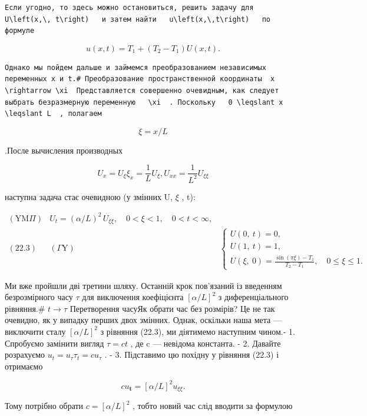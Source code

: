 \documentclass[
  ukrainian,
]{article}
\begin{document}
\begin{verbatim}
Если угодно, то здесь можно остановиться, решить задачу для   U\left(x,\, t\right)   и затем найти   u\left(x,\,t\right)   по формуле
\end{verbatim}

\[
u(x, t) = T_1 + (T_2 - T_1) U(x, t).
\]

\begin{verbatim}
Однако мы пойдем дальше и займемся преобразованием независимых переменных x и t.# Преобразование пространственной координаты  x \rightarrow \xi  Представляется совершенно очевидным, как следует выбрать безразмерную переменную   \xi  . Поскольку   0 \leqslant x \leqslant L  , полагаем
\end{verbatim}

\[
\xi = x/L
\]

.После вычисления производных

\[
U_x = U_{\xi} \xi_x = \frac{1}{L} U_{\xi},
U_{xx} = \frac{1}{L^2} U_{\xi\xi}
\]

наступна задача стає очевидною (у змінних U, \(\xi\) , t):

\[
\begin{array}{ll} (\text{YM}\Pi) & U_t = (\alpha/L)^2 \, U_{\xi\xi}, \quad 0 < \xi < 1, \quad 0 < t < \infty, \\ (22.3) & (\Gamma \text{Y}) & \begin{cases} U(0,\ t) = 0, \\ U(1,\ t) = 1, \\ U(\xi,\ 0) = \frac{\sin\left(\pi\xi\right) - T_1}{T_2 - T_1}, \quad 0 \leqslant \xi \leqslant 1. \end{cases} \end{array}
\]

Ми вже пройшли дві третини шляху. Останній крок пов'язаний із введенням
безрозмірного часу \(\tau\) для виключення коефіцієнта \([\alpha/L]^2\)
з диференціального рівняння.\# \(t \rightarrow \tau\) Перетворення
часуЯк обрати час без розмірів? Це не так очевидно, як у випадку перших
двох змінних. Однак, оскільки наша мета --- виключити сталу
\([\alpha/L]^2\) з рівняння (22.3), ми діятимемо наступним чином.- 1.
Спробуємо замінити вигляд \(\tau = ct\) , де c --- невідома константа. -
2. Давайте розрахуємо \(u_t = u_{\tau} \tau_t = c u_{\tau}\) . - 3.
Підставимо цю похідну у рівняння (22.3) і отримаємо

\[
cu_{\mathbf{t}} = [\alpha/L]^2 u_{\xi\xi}.
\]

Тому потрібно обрати \(c = [\alpha/L]^2\) , тобто новий час слід вводити
за формулою
\end{document}
